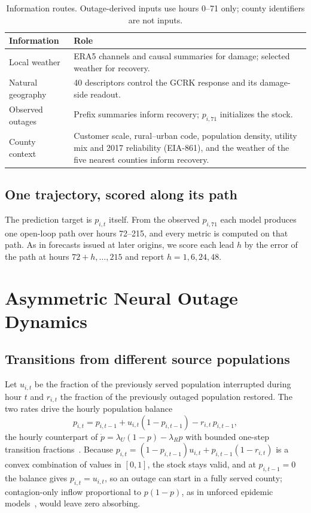\documentclass[10pt,twocolumn,letterpaper]{article}
\begin{document}
\begin{table}[t]
\centering\small
\caption{Information routes. Outage-derived inputs use hours 0--71 only; county identifiers are not inputs.}
\label{tab:inputs}
\begin{tabular}{@{}p{}p{}@{}}
\toprule
Information & Role\\
\midrule
Local weather & ERA5 channels and causal summaries for damage; selected weather for recovery.\\
Natural geography & 40 descriptors control the GCRK response and its damage-side readout.\\
Observed outages & Prefix summaries inform recovery; $p_{i,71}$ initializes the stock.\\
County context & Customer scale, rural--urban code, population density, utility mix and 2017 reliability (EIA-861), and
the weather of the five nearest counties inform recovery.\\
\bottomrule
\end{tabular}
\end{table}

\subsection{One trajectory, scored along its path}
The prediction target is $p_{i,t}$ itself. From the observed $p_{i,71}$ each model produces one open-loop path over hours
72--215, and every metric is computed on that path. As in forecasts issued at later origins, we score each lead $h$ by
the error of the path at hours $72+h,\dots,215$ and report $h=1,6,24,48$.

\section{Asymmetric Neural Outage Dynamics}
\subsection{Transitions from different source populations}
Let $u_{i,t}$ be the fraction of the previously served population interrupted during hour $t$ and $r_{i,t}$ the fraction of
the previously outaged population restored. The two rates drive the hourly population balance
\begin{equation}
p_{i,t}=p_{i,t-1}+u_{i,t}(1-p_{i,t-1})-r_{i,t}\,p_{i,t-1}, \label{eq:balance}
\end{equation}
the hourly counterpart of $\dot p=\lambda_U(1-p)-\lambda_R p$ with bounded one-step transition
fractions~\cite{chen2018}. Because $p_{i,t}=(1-p_{i,t-1})u_{i,t}+p_{i,t-1}(1-r_{i,t})$ is a convex combination of values in
$[0,1]$, the stock stays valid, and at $p_{i,t-1}=0$ the balance gives $p_{i,t}=u_{i,t}$, so an outage can start in a fully
served county; contagion-only inflow proportional to $p(1-p)$, as in unforced epidemic models~\cite{kermack1927}, would
leave zero absorbing.
\end{document}
